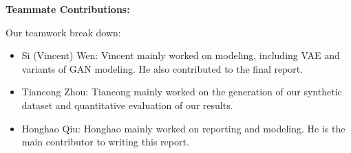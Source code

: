\documentclass[10pt,conference]{IEEEtran}
\begin{document}
\textbf{Teammate Contributions:}

Our teamwork break down:
\begin{itemize}
\item Si (Vincent) Wen: Vincent mainly worked on modeling, including VAE and variants of GAN modeling. He also contributed to the final report.
\item Tiancong Zhou: Tiancong mainly worked on the generation of our synthetic dataset and quantitative evaluation of our results.
\item Honghao Qiu: Honghao mainly worked on reporting and modeling. He is the main contributor to writing this report.
\end{itemize}

\printbibliography
\end{document}
